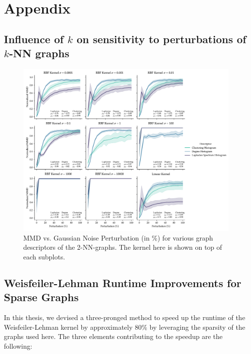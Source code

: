 \chapter{Appendix}

\section{Influence of $k$ on sensitivity to perturbations of $k$-NN graphs}

\begin{figure}[h]
  \centering
  \includegraphics[width=\textwidth]{./figures/results/res_1_5.pdf}
  \caption[MMD vs. Gaussian Noise Perturbation (in \%) for various graph
descriptors of the 2-NN-graphs.]{MMD vs. Gaussian Noise Perturbation (in \%) for
various graph descriptors of the 2-NN-graphs. The kernel here is shown on top of
each subplots.}
  \label{fig:mmd_effect_kernel_knn}
\end{figure}


\section{Weisfeiler-Lehman Runtime Improvements for Sparse
  Graphs}\label{sec:sparse_wl}

In this thesis, we devised a three-pronged method to speed up the runtime of the
Weisfeiler-Lehman kernel by approximately 80\% by leveraging the sparsity of the
graphs used here. The three elements contributing to the speedup are the
following:


